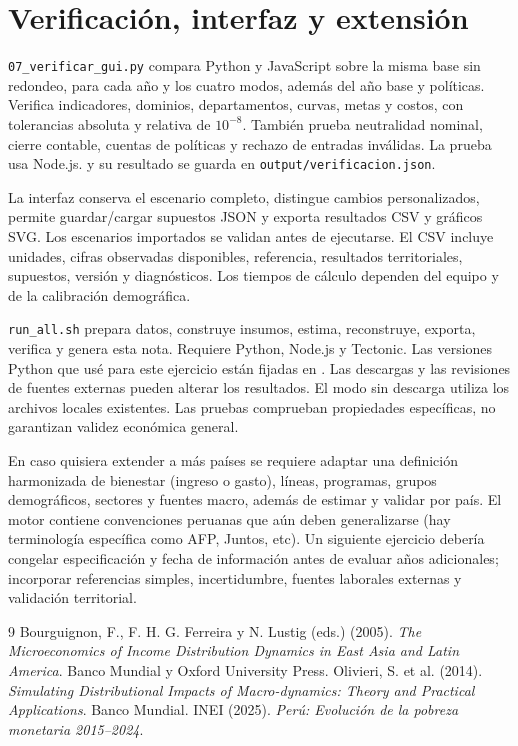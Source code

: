 \documentclass[11pt,a4paper]{article}
\begin{document}
\section{Verificación, interfaz y extensión}
\texttt{07\_verificar\_gui.py} compara Python y JavaScript sobre la misma base sin redondeo, para cada año y los cuatro modos, además del año base y políticas. Verifica indicadores, dominios, departamentos, curvas, metas y costos, con tolerancias absoluta y relativa de \(10^{-8}\). También prueba neutralidad nominal, cierre contable, cuentas de políticas y rechazo de entradas inválidas. La prueba usa Node.js. y su resultado se guarda en \texttt{output/verificacion.json}.

La interfaz conserva el escenario completo, distingue cambios personalizados, permite guardar/cargar supuestos JSON y exporta resultados CSV y gráficos SVG. Los escenarios importados se validan antes de ejecutarse. El CSV incluye unidades, cifras observadas disponibles, referencia, resultados territoriales, supuestos, versión y diagnósticos. Los tiempos de cálculo dependen del equipo y de la calibración demográfica.

\texttt{run\_all.sh} prepara datos, construye insumos, estima, reconstruye, exporta, verifica y genera esta nota. Requiere Python, Node.js y Tectonic. Las versiones Python que usé para este ejercicio están fijadas en . Las descargas y las revisiones de fuentes externas pueden alterar los resultados. El modo sin descarga utiliza los archivos locales existentes. Las pruebas comprueban propiedades específicas, no garantizan validez económica general.

En caso quisiera extender a más países se requiere adaptar una definición harmonizada de bienestar (ingreso o gasto), líneas, programas, grupos demográficos, sectores y fuentes macro, además de estimar y validar por país. El motor contiene convenciones peruanas que aún deben generalizarse (hay terminología específica como AFP, Juntos, etc). Un siguiente ejercicio debería congelar especificación y fecha de información antes de evaluar años adicionales; incorporar referencias simples, incertidumbre, fuentes laborales externas y validación territorial.

\begin{thebibliography}{9}\small
{} Bourguignon, F., F. H. G. Ferreira y N. Lustig (eds.) (2005). \emph{The Microeconomics of Income Distribution Dynamics in East Asia and Latin America}. Banco Mundial y Oxford University Press.
 Olivieri, S. et al. (2014). \emph{Simulating Distributional Impacts of Macro-dynamics: Theory and Practical Applications}. Banco Mundial.
 INEI (2025). \emph{Perú: Evolución de la pobreza monetaria 2015--2024}.
\end{thebibliography}
\end{document}
